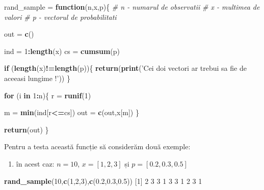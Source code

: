 \documentclass[]{article}
\newenvironment{Shaded}{\begin{snugshade}}{\end{snugshade}}
\newcommand{\KeywordTok}[1]{\textcolor[rgb]{0.13,0.29,0.53}{\textbf{#1}}}
\newcommand{\DecValTok}[1]{\textcolor[rgb]{0.00,0.00,0.81}{#1}}
\newcommand{\FloatTok}[1]{\textcolor[rgb]{0.00,0.00,0.81}{#1}}
\newcommand{\StringTok}[1]{\textcolor[rgb]{0.31,0.60,0.02}{#1}}
\newcommand{\CommentTok}[1]{\textcolor[rgb]{0.56,0.35,0.01}{\textit{#1}}}
\newcommand{\ControlFlowTok}[1]{\textcolor[rgb]{0.13,0.29,0.53}{\textbf{#1}}}
\newcommand{\OperatorTok}[1]{\textcolor[rgb]{0.81,0.36,0.00}{\textbf{#1}}}
\newcommand{\NormalTok}[1]{#1}
\providecommand{\tightlist}{%
  \setlength{\itemsep}{0pt}\setlength{\parskip}{0pt}}
\begin{document}
\begin{Shaded}
\begin{Highlighting}[]
\NormalTok{rand_sample =}\StringTok{ }\ControlFlowTok{function}\NormalTok{(n,x,p)\{}
  \CommentTok{# n - numarul de observatii}
  \CommentTok{# x - multimea de valori}
  \CommentTok{# p - vectorul de probabilitati}
  
\NormalTok{  out =}\StringTok{ }\KeywordTok{c}\NormalTok{()}
  
\NormalTok{  ind =}\StringTok{ }\DecValTok{1}\OperatorTok{:}\KeywordTok{length}\NormalTok{(x)}
\NormalTok{  cs =}\StringTok{ }\KeywordTok{cumsum}\NormalTok{(p) }
  
  \ControlFlowTok{if}\NormalTok{ (}\KeywordTok{length}\NormalTok{(x)}\OperatorTok{!=}\KeywordTok{length}\NormalTok{(p))\{}
    \KeywordTok{return}\NormalTok{(}\KeywordTok{print}\NormalTok{(}\StringTok{'Cei doi vectori ar trebui sa fie de aceeasi lungime !'}\NormalTok{))}
\NormalTok{  \}}
  
  \ControlFlowTok{for}\NormalTok{ (i }\ControlFlowTok{in} \DecValTok{1}\OperatorTok{:}\NormalTok{n)\{}
\NormalTok{    r =}\StringTok{ }\KeywordTok{runif}\NormalTok{(}\DecValTok{1}\NormalTok{)}
    
\NormalTok{    m =}\StringTok{ }\KeywordTok{min}\NormalTok{(ind[r}\OperatorTok{<=}\NormalTok{cs])}
\NormalTok{    out =}\StringTok{ }\KeywordTok{c}\NormalTok{(out,x[m])}
\NormalTok{  \}}
  
  \KeywordTok{return}\NormalTok{(out)}
\NormalTok{\}}
\end{Highlighting}
\end{Shaded}

Pentru a testa această funcție să considerăm două exemple:

\begin{enumerate}
\def\labelenumi{\arabic{enumi}.}
\tightlist
\item
  în acest caz: \(n=10\), \(x=[1,2,3]\) și \(p=[0.2,0.3,0.5]\)
\end{enumerate}

\begin{Shaded}
\begin{Highlighting}[]
\KeywordTok{rand_sample}\NormalTok{(}\DecValTok{10}\NormalTok{,}\KeywordTok{c}\NormalTok{(}\DecValTok{1}\NormalTok{,}\DecValTok{2}\NormalTok{,}\DecValTok{3}\NormalTok{),}\KeywordTok{c}\NormalTok{(}\FloatTok{0.2}\NormalTok{,}\FloatTok{0.3}\NormalTok{,}\FloatTok{0.5}\NormalTok{))}
\NormalTok{ [}\DecValTok{1}\NormalTok{] }\DecValTok{2} \DecValTok{3} \DecValTok{3} \DecValTok{1} \DecValTok{3} \DecValTok{3} \DecValTok{1} \DecValTok{2} \DecValTok{3} \DecValTok{1}
\end{Highlighting}
\end{Shaded}
\end{document}

